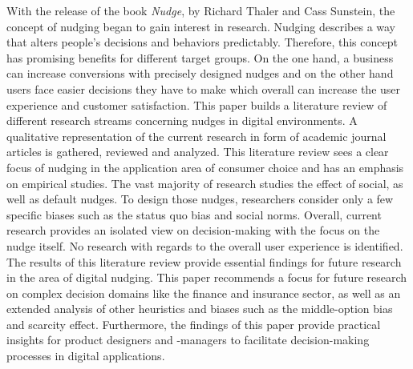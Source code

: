 With the release of the book \textit{Nudge}, by Richard Thaler and Cass Sunstein, the concept of nudging began to gain interest in research. Nudging describes a way that alters people's decisions and behaviors predictably. Therefore, this concept has promising benefits for different target groups. On the one hand, a business can increase conversions with precisely designed nudges and on the other hand users face easier decisions they have to make which overall can increase the user experience and customer satisfaction. This paper builds a literature review of different research streams concerning nudges in digital environments. A qualitative representation of the current research in form of academic journal articles is gathered, reviewed and analyzed.
This literature review sees a clear focus of nudging in the application area of consumer choice and has an emphasis on empirical studies. The vast majority of research studies the effect of social, as well as default nudges. To design those nudges, researchers consider only a few specific biases such as the status quo bias and social norms. Overall, current research provides an isolated view on decision-making with the focus on the nudge itself. No research with regards to the overall user experience is identified. The results of this literature review provide essential findings for future research in the area of digital nudging. This paper recommends a focus for future research on complex decision domains like the finance and insurance sector, as well as an extended analysis of other heuristics and biases such as the middle-option bias and scarcity effect. Furthermore, the findings of this paper provide practical insights for product designers and -managers to facilitate decision-making processes in digital applications.
